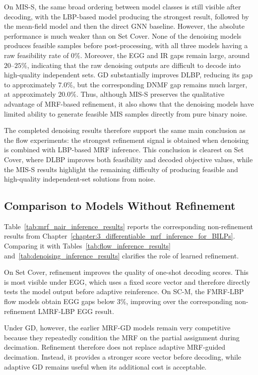 On MIS-S, the same broad ordering between model classes is still visible after decoding, with the LBP-based model producing the strongest result, followed by the mean-field model and then the direct GNN baseline. However, the absolute performance is much weaker than on Set Cover. None of the denoising models produces feasible samples before post-processing, with all three models having a raw feasibility rate of $0\%$. Moreover, the EGG and IR gaps remain large, around $20$--$25\%$, indicating that the raw denoising outputs are difficult to decode into high-quality independent sets. GD substantially improves DLBP, reducing its gap to approximately $7.0\%$, but the corresponding DNMF gap remains much larger, at approximately $20.0\%$. Thus, although MIS-S preserves the qualitative advantage of MRF-based refinement, it also shows that the denoising models have limited ability to generate feasible MIS samples directly from pure binary noise.

The completed denoising results therefore support the same main conclusion as the flow experiments: the strongest refinement signal is obtained when denoising is combined with LBP-based MRF inference. This conclusion is clearest on Set Cover, where DLBP improves both feasibility and decoded objective values, while the MIS-S results highlight the remaining difficulty of producing feasible and high-quality independent-set solutions from noise.

\subsection{Comparison to Models Without Refinement}
\label{subsec:comparison_with_previous_chapter}

Table~\ref{tab:mrf_nair_inference_results} reports the corresponding non-refinement results from Chapter~\ref{chapter:3_differentiable_mrf_inference_for_BILPs}. Comparing it with Tables~\ref{tab:flow_inference_results} and~\ref{tab:denoising_inference_results} clarifies the role of learned refinement.

On Set Cover, refinement improves the quality of one-shot decoding scores. This is most visible under EGG, which uses a fixed score vector and therefore directly tests the model output before adaptive reinference. On SC-M, the FMRF-LBP flow models obtain EGG gaps below $3\%$, improving over the corresponding non-refinement LMRF-LBP EGG result.

Under GD, however, the earlier MRF-GD models remain very competitive because they repeatedly condition the MRF on the partial assignment during decimation. Refinement therefore does not replace adaptive MRF-guided decimation. Instead, it provides a stronger score vector before decoding, while adaptive GD remains useful when its additional cost is acceptable.

